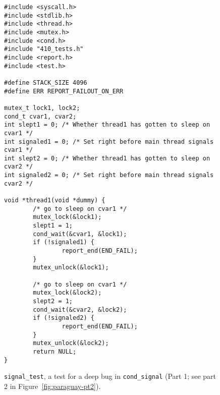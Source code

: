 \documentclass[pldi]{../sigplanconf-pldi15}
\begin{document}
\begin{figure*}
\begin{verbatim}
#include <syscall.h>
#include <stdlib.h>
#include <thread.h>
#include <mutex.h>
#include <cond.h>
#include "410_tests.h"
#include <report.h>
#include <test.h>

#define STACK_SIZE 4096
#define ERR REPORT_FAILOUT_ON_ERR

mutex_t lock1, lock2;
cond_t cvar1, cvar2;
int slept1 = 0; /* Whether thread1 has gotten to sleep on cvar1 */
int signaled1 = 0; /* Set right before main thread signals cvar1 */
int slept2 = 0; /* Whether thread1 has gotten to sleep on cvar2 */
int signaled2 = 0; /* Set right before main thread signals cvar2 */

void *thread1(void *dummy) {
        /* go to sleep on cvar1 */
        mutex_lock(&lock1);
        slept1 = 1;
        cond_wait(&cvar1, &lock1);
        if (!signaled1) {
                report_end(END_FAIL);
        }   
        mutex_unlock(&lock1);

        /* go to sleep on cvar1 */
        mutex_lock(&lock2);
        slept2 = 1;
        cond_wait(&cvar2, &lock2);
        if (!signaled2) {
                report_end(END_FAIL);
        }   
        mutex_unlock(&lock2);
        return NULL;
}
\end{verbatim}
	\caption{{\tt signal\_test},
	a test for a deep bug in {\tt cond\_signal} (Part 1; see part 2 in Figure~\ref{fig:paraguay-pt2}).}
	\label{fig:paraguay}
\end{figure*}
\end{document}
